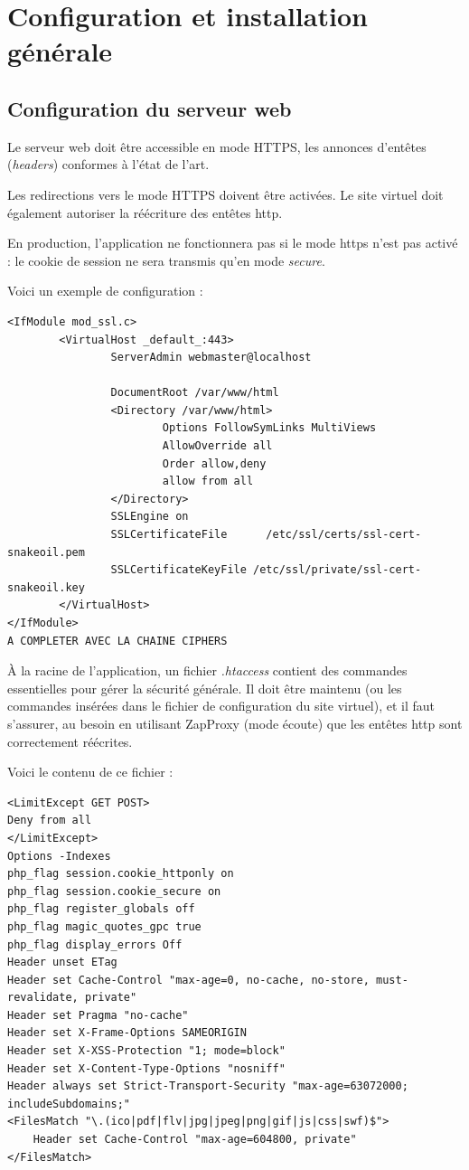 \section{Configuration et installation générale}

\subsection{Configuration du serveur web}

Le serveur web doit être accessible en mode HTTPS, les annonces d'entêtes (\textit{headers}) conformes à l'état de l'art.

Les redirections vers le mode HTTPS doivent être activées. Le site virtuel doit également autoriser la réécriture des entêtes http.

En production, l'application ne fonctionnera pas si le mode https n'est pas activé : le cookie de session ne sera transmis qu'en mode \textit{secure}.

Voici un exemple de configuration :

\begin{lstlisting}
<IfModule mod_ssl.c>
        <VirtualHost _default_:443>
                ServerAdmin webmaster@localhost

                DocumentRoot /var/www/html
                <Directory /var/www/html>
                        Options FollowSymLinks MultiViews
                        AllowOverride all
                        Order allow,deny
                        allow from all
                </Directory>
                SSLEngine on
                SSLCertificateFile      /etc/ssl/certs/ssl-cert-snakeoil.pem
                SSLCertificateKeyFile /etc/ssl/private/ssl-cert-snakeoil.key
        </VirtualHost>
</IfModule>
A COMPLETER AVEC LA CHAINE CIPHERS
\end{lstlisting}

À la racine de l'application, un fichier \textit{.htaccess} contient des commandes essentielles pour gérer la sécurité générale. Il doit être maintenu (ou les commandes insérées dans le fichier de configuration du site virtuel), et il faut s'assurer, au besoin en utilisant ZapProxy (mode écoute) que les entêtes http sont correctement réécrites.

Voici le contenu de ce fichier :
\begin{lstlisting}
<LimitExcept GET POST>
Deny from all
</LimitExcept>
Options -Indexes
php_flag session.cookie_httponly on
php_flag session.cookie_secure on
php_flag register_globals off
php_flag magic_quotes_gpc true
php_flag display_errors Off
Header unset ETag
Header set Cache-Control "max-age=0, no-cache, no-store, must-revalidate, private"
Header set Pragma "no-cache"
Header set X-Frame-Options SAMEORIGIN
Header set X-XSS-Protection "1; mode=block"
Header set X-Content-Type-Options "nosniff"
Header always set Strict-Transport-Security "max-age=63072000; includeSubdomains;"
<FilesMatch "\.(ico|pdf|flv|jpg|jpeg|png|gif|js|css|swf)$">
    Header set Cache-Control "max-age=604800, private"
</FilesMatch>

\end{lstlisting}

